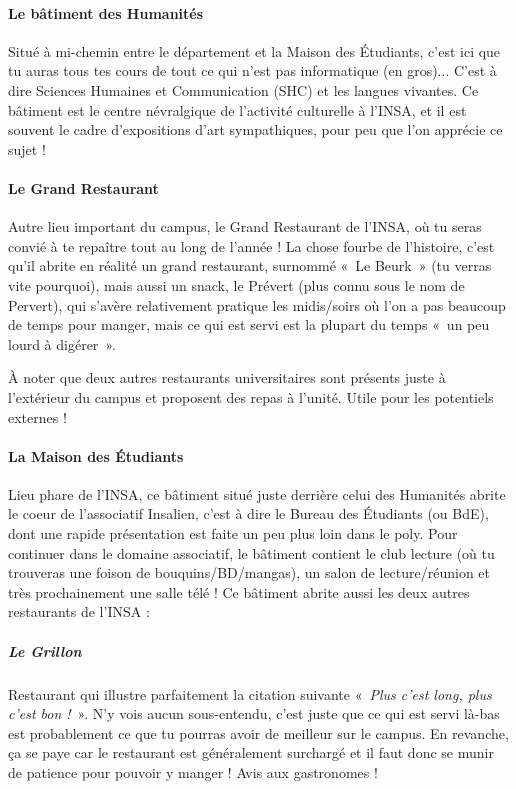 \paragraph{Le bâtiment des Humanités}
Situé à mi-chemin entre le département et la Maison des Étudiants, c'est ici
que tu auras tous tes cours de tout ce qui n'est pas informatique (en gros)... C'est à
dire Sciences Humaines et Communication (SHC) et les langues vivantes. 
Ce bâtiment est le centre névralgique de l'activité culturelle à l'INSA, et il
est souvent le cadre d'expositions d'art sympathiques, pour peu que l'on apprécie ce sujet !

\paragraph{Le Grand Restaurant}
Autre lieu important du campus, le Grand Restaurant de l'INSA, où tu
seras convié à te repaître tout au long de l'année ! La chose fourbe de l'histoire, c'est qu'il abrite
en réalité un grand restaurant, surnommé «~Le Beurk~» (tu verras vite pourquoi), mais aussi
un snack, le Prévert (plus connu sous le nom de Pervert), qui s'avère
relativement pratique les midis/soirs où l'on a pas beaucoup de temps pour manger, mais ce
qui est servi est la plupart du temps «~un peu lourd à digérer~».

\vspace{1em}

À noter que deux autres restaurants universitaires sont présents juste à l'extérieur du campus et proposent
des repas à l'unité. Utile pour les potentiels externes !

\paragraph{La Maison des Étudiants}
Lieu phare de l'INSA, ce bâtiment situé juste derrière celui des Humanités
abrite le coeur de l'associatif Insalien, c'est à dire le Bureau des Étudiants (ou
BdE), dont une rapide présentation est faite un peu plus loin dans le
poly. Pour continuer dans le domaine associatif, le bâtiment contient le
club lecture (où tu trouveras une foison de bouquins/BD/mangas), un salon de
lecture/réunion et très prochainement une salle télé !
Ce bâtiment abrite aussi les deux autres restaurants de l'INSA :

\subparagraph{Le Grillon}
Restaurant qui illustre parfaitement la citation suivante «~\emph{Plus c'est long,
	   plus c'est bon !}~». N'y vois aucun sous-entendu, c'est juste que ce qui est servi là-bas est probablement
ce que tu pourras avoir de meilleur sur le campus. En revanche, ça se paye car le restaurant 
est généralement surchargé et il faut donc se munir de patience pour pouvoir y manger ! Avis aux gastronomes !

